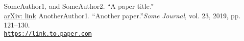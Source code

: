 \begin{thebibliography}{99}
		SomeAuthor1, and SomeAuthor2. ``A paper title.''\\
		\href{https://arxiv.org/}{arXiv: link}
		AnotherAuthor1. “Another paper.”\textit{Some Journal}, vol. 23, 2019, pp. 121–130.\\
		\href{https://arxiv}{\texttt{https://link.to.paper.com}}
	
	
\end{thebibliography}
